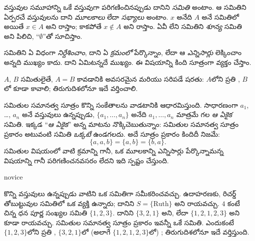 \documentclass[../../../include/open-logic-section]{subfiles}
\begin{document}

వస్తువుల సమూహాన్ని {ఒకే} వస్తువుగా పరిగణించినప్పుడు దానిని
\emph{సమితి} అంటాం. ఆ సమితిని ఏర్పరచే వస్తువులను దాని
\emph{మూలకాలు} లేదా \emph{సభ్యాలు} అంటాం. $x$ అనేది $A$ అనే
సమితిలో  అయితే $x \in A$ అని రాస్తాం; కాకపోతే
$x \notin A$ అని రాస్తాం.  ఏవీ లేని సమితిని
\emph{శూన్య} సమితి అని పిలిచి, ``$\emptyset$''తో సూచిస్తాం.

\begin{explain}
సమితిని ఏ విధంగా \emph{నిర్దేశించాం}, దాని
 ఏ \emph{క్రమంలో} పేర్కొన్నాం, లేదా
ఆ  \emph{ఎన్నిసార్లు} లెక్కించాం అన్నది ముఖ్యం కాదు.
దాని  ఏమిటన్నదే ముఖ్యం. ఈ విషయాన్ని కింది సూత్రంగా
వ్యక్తం చేస్తాం.
\end{explain}

\begin{defn}[సమితుల సమానత్వ సూత్రం]
  $A$, $B$ సమితులైతే, $A = B$ కావడానికి అవసరమైన మరియు సరిపడే
  షరతు: $A$లోని ప్రతి , $B$లో కూడా 
  కావాలి; తిరుగుదిశలోనూ ఇదే వర్తించాలి.
\end{defn}

సమితుల సమానత్వ సూత్రం కొన్ని సంకేతాలను వాడటానికి ఆధారమిస్తుంది.
సాధారణంగా $a_{1}$, \dots, $a_{n}$ అనే వస్తువులు ఉన్నప్పుడు,
$\{a_{1}, \dots, a_{n}\}$ అనేది $a_1, \ldots, a_n$ మాత్రమే
 గల \emph{ఆ ఏకైక} సమితి. ఇక్కడ
``\emph{ఆ ఏకైక}'' అన్న మాటను నొక్కిచెబుతున్నాం: సమితుల సమానత్వ
సూత్రం ప్రకారం అటువంటి సమితి \emph{ఒక్కటే} ఉండగలదు.
అదే సూత్రం ప్రకారం కిందిదీ నిజమే:
  \[
    \{a, a, b\} = \{a, b\} = \{b,a\}.
  \]
సమితుల విషయంలో వాటి  క్రమాన్ని గానీ,
ఒక మూలకాన్ని ఎన్నిసార్లు పేర్కొన్నామన్న విషయాన్ని గానీ పరిగణించనవసరం
లేదని ఇది స్పష్టం చేస్తుంది.

\begin{tagblock}{novice}
\begin{ex}
కొన్ని వస్తువులు ఉన్నప్పుడు వాటిని ఒక సమితిగా సమీకరించవచ్చు.
ఉదాహరణకు, రిచర్డ్ తోబుట్టువుల సమితిలో ఒక వ్యక్తి ఉన్నారు;
దానిని $S=\{\textrm{Ruth}\}$ అని రాయవచ్చు.
$4$ కంటే చిన్న ధన పూర్ణ సంఖ్యల సమితి $\{1, 2, 3\}$.
దానిని $\{3, 2, 1\}$ అని, లేదా $\{1, 2, 1, 2, 3\}$ అని కూడా
రాయవచ్చు. సమితుల సమానత్వ సూత్రం ప్రకారం ఇవన్నీ ఒకే సమితి.
ఎందుకంటే $\{1, 2, 3\}$లోని ప్రతి , $\{3, 2, 1\}$లో
(అలాగే $\{1, 2, 1, 2, 3\}$లో) ; తిరుగుదిశలోనూ
ఇదే వర్తిస్తుంది.
\end{ex}
\end{tagblock}
\end{document}
